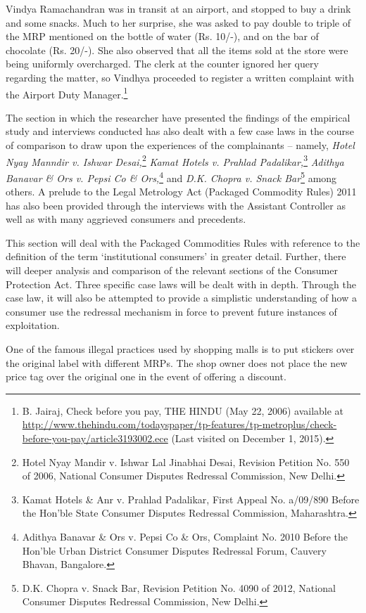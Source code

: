 \begin{multicols}{2}
\noi
Vindya Ramachandran was in transit at an airport, and stopped to buy a drink and some snacks.
Much to her surprise, she was asked to pay double to triple of the MRP mentioned on the bottle
of water (Rs. 10/-), and on the bar of chocolate (Rs. 20/-). She also observed that all the items
sold at the store were being uniformly overcharged. The clerk at the counter ignored her query
regarding the matter, so Vindhya proceeded to register a written complaint with the Airport
Duty Manager.\footnote{B. Jairaj, Check before you pay, THE HINDU (May 22, 2006) available at \url{http://www.thehindu.com/todayspaper/tp-features/tp-metroplus/check-before-you-pay/article3193002.ece} (Last visited on December 1, 2015).}

\noi
The section in which the researcher have presented the findings of the empirical study and
interviews conducted has also dealt with a few case laws in the course of comparison to draw
upon the experiences of the complainants – namely, \textit{Hotel Nyay Manndir v. Ishwar Desai,}\footnote{Hotel Nyay Mandir v. Ishwar Lal Jinabhai Desai, Revision Petition No. 550 of 2006, National Consumer Disputes Redressal Commission, New Delhi.} \textit{Kamat Hotels v. Prahlad Padalikar,}\footnote{Kamat Hotels \& Anr v. Prahlad Padalikar, First Appeal No. a/09/890 Before the Hon’ble State Consumer Disputes Redressal Commission, Maharashtra.} \textit{Adithya Banavar \& Ors v. Pepsi Co \& Ors,}\footnote{Adithya Banavar \& Ors v. Pepsi Co \& Ors, Complaint No. 2010 Before the Hon’ble Urban District Consumer Disputes Redressal Forum, Cauvery Bhavan, Bangalore.} and \textit{D.K. Chopra v. Snack Bar}\footnote{D.K. Chopra v. Snack Bar, Revision Petition No. 4090 of 2012, National Consumer Disputes Redressal Commission, New Delhi.} among others. A prelude to the Legal Metrology Act (Packaged Commodity Rules) 2011 has also been provided through the interviews with the Assistant Controller as well as with many aggrieved consumers and precedents.

\noi
This section will deal with the Packaged Commodities Rules with reference to the definition
of the term ‘institutional consumers’ in greater detail. Further, there will deeper analysis and
comparison of the relevant sections of the Consumer Protection Act. Three specific case laws
will be dealt with in depth. Through the case law, it will also be attempted to provide a
simplistic understanding of how a consumer use the redressal mechanism in force to prevent
future instances of exploitation.

\noi
One of the famous illegal practices used by shopping malls is to put stickers over the original
label with different MRPs. The shop owner does not place the new price tag over the original
one in the event of offering a discount.


\end{multicols}
